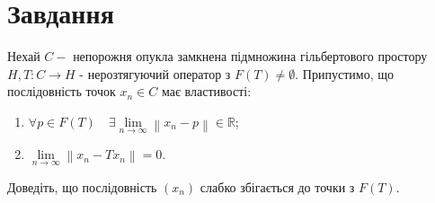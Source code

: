 
\chapter{Завдання \theHchapter}

\begin{tcolorbox}[title=Завдання]
    Нехай $C-$ непорожня опукла замкнена підмножина гільбертового простору 
    $H, T: C \rightarrow H$ - нерозтягуючий оператор з $F(T) \neq \emptyset$.
    Припустимо, що послідовність точок $x_{n} \in C$ має властивості:
    \begin{enumerate}
        \item $\forall p \in F(T) \quad \exists \lim\limits_{n \rightarrow \infty}
        \left\|x_{n}-p\right\| \in \mathbb{R}$;
        \item $\lim\limits_{n \rightarrow \infty}\left\|x_{n}-T x_{n}\right\|=0$.
    \end{enumerate}

    Доведіть, що послідовність $\left(x_{n}\right)$ слабко 
    збігається до точки з $ F(T)$.
\end{tcolorbox}

